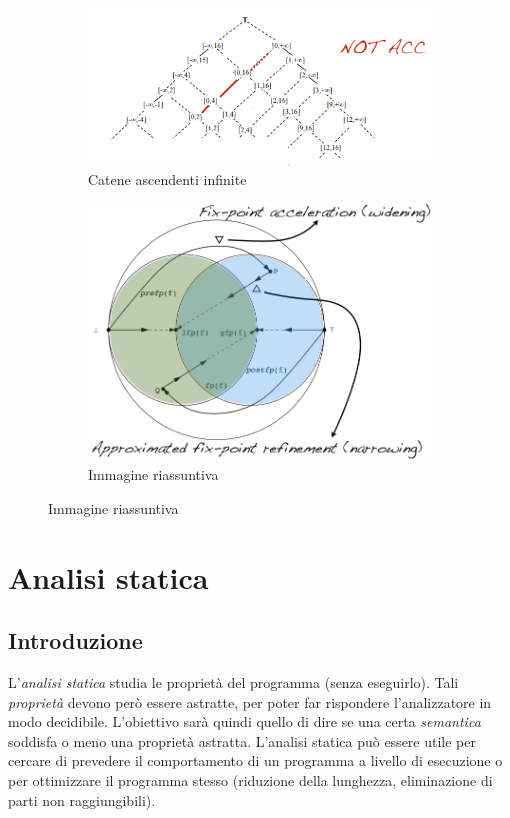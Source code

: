 \documentclass[a4paper,oneside,titlepage]{book}
\begin{document}
\begin{figure}[htp]
	\begin{subfigure}{0.49\textwidth}
	    \centering
		\includegraphics[width=\textwidth, height=\textheight, keepaspectratio]{fpEx1.png}
		\caption{Catene ascendenti infinite}
	\end{subfigure}
	\hfill
	\begin{subfigure}{0.49\textwidth}
	    \centering
		\includegraphics[width=\textwidth, height=\textheight, keepaspectratio]{fpEx2.png} 
		\caption{Immagine riassuntiva}
	\end{subfigure}
\end{figure}


\chapter{Analisi statica}

\section{Introduzione} %
L'\textit{analisi statica} studia le proprietà del programma (senza eseguirlo). Tali \textit{proprietà} devono però essere astratte, per poter far rispondere l'analizzatore in modo decidibile. L'obiettivo sarà quindi quello di dire se una certa \textit{semantica} soddisfa o meno una proprietà astratta. L'analisi statica può essere utile per cercare di prevedere il comportamento di un programma a livello di esecuzione o per ottimizzare il programma stesso (riduzione della lunghezza, eliminazione di parti non raggiungibili).
\end{document}
